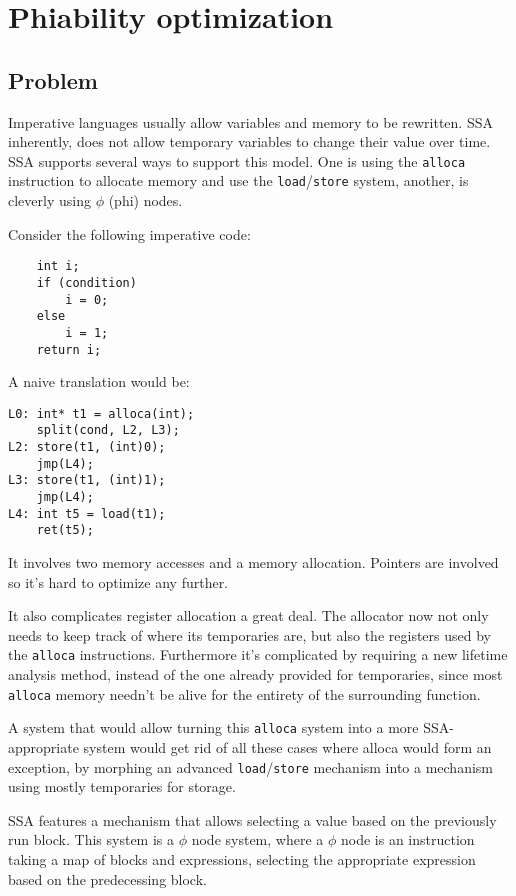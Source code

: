 \documentclass[12pt, a4paper]{article}
\begin{document}
  \section{Phiability optimization}
  \subsection{Problem}
Imperative languages usually allow variables and memory to be rewritten. SSA 
inherently, does not allow temporary variables to change their value over time. 
SSA supports several ways to support this model. One is using the \verb+alloca+
instruction to allocate memory and use the \verb+load+/\verb+store+ system,
another, is cleverly using $\phi$ (phi) nodes.

Consider the following imperative code:

\begin{lstlisting}
	int i;
	if (condition)
		i = 0;
	else
		i = 1;
	return i;
\end{lstlisting}

A naive translation would be:

\begin{lstlisting}
L0:	int* t1 = alloca(int);
	split(cond, L2, L3);
L2:	store(t1, (int)0);
	jmp(L4);
L3:	store(t1, (int)1);
	jmp(L4);
L4:	int t5 = load(t1);
	ret(t5);
\end{lstlisting}

It involves two memory accesses and a memory allocation. Pointers are involved
so it's hard to optimize any further.

It also complicates register allocation a great deal. The allocator now not 
only needs to keep track of where its temporaries are, but also the registers 
used by the \verb+alloca+ instructions. Furthermore it's complicated by 
requiring a new lifetime analysis method, instead of the one already provided 
for temporaries, since most \verb+alloca+ memory needn't be alive for the 
entirety of the surrounding function.

A system that would allow turning this \verb+alloca+ system into a more
SSA-appropriate  system would get rid of all these cases where alloca would form
an exception, by morphing an advanced \verb+load+/\verb+store+ mechanism into a
mechanism using mostly temporaries for storage.

SSA features a mechanism that allows selecting a value based on the previously 
run block. This system is a $\phi$ node system, where a $\phi$ node is an
instruction taking a map of blocks and expressions, selecting the appropriate
expression based on the predecessing block.
\end{document}
